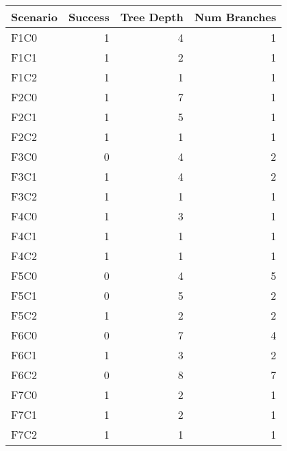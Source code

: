 \begin{tabular}{lrrr}
\toprule
Scenario & Success & Tree Depth & Num Branches \\
\midrule
F1C0 & 1 & 4 & 1 \\
F1C1 & 1 & 2 & 1 \\
F1C2 & 1 & 1 & 1 \\
F2C0 & 1 & 7 & 1 \\
F2C1 & 1 & 5 & 1 \\
F2C2 & 1 & 1 & 1 \\
F3C0 & 0 & 4 & 2 \\
F3C1 & 1 & 4 & 2 \\
F3C2 & 1 & 1 & 1 \\
F4C0 & 1 & 3 & 1 \\
F4C1 & 1 & 1 & 1 \\
F4C2 & 1 & 1 & 1 \\
F5C0 & 0 & 4 & 5 \\
F5C1 & 0 & 5 & 2 \\
F5C2 & 1 & 2 & 2 \\
F6C0 & 0 & 7 & 4 \\
F6C1 & 1 & 3 & 2 \\
F6C2 & 0 & 8 & 7 \\
F7C0 & 1 & 2 & 1 \\
F7C1 & 1 & 2 & 1 \\
F7C2 & 1 & 1 & 1 \\
\bottomrule
\end{tabular}
